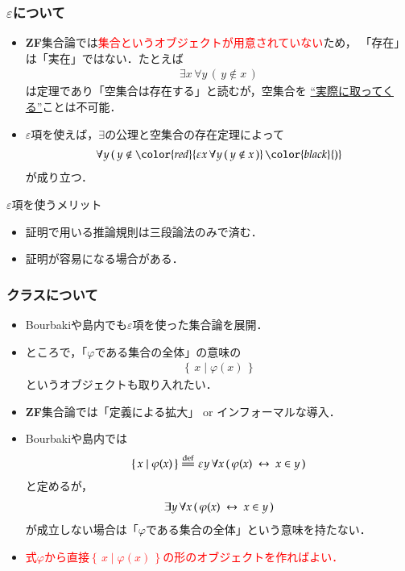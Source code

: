 \documentclass[dvipdfmx,10pt,notheorems]{beamer}
\theoremstyle{definition}
\newcommand{\Set}[2]{\left\{\, #1 \mid #2\, \right\}} %
\newcommand{\defeq}{\overset{\mathrm{def}}{=\joinrel=}} %
\newcommand{\lrarrow}{\hspace{0.25em}\leftrightarrow\hspace{0.25em}} %
\begin{document}
\begin{frame}\frametitle{$\varepsilon$について}
	\begin{itemize}
	\setlength{\itemsep}{10pt}
		\item {\bf ZF}集合論では\textcolor{red}{集合というオブジェクトが用意されていない}ため，
			「存在」は「実在」ではない．たとえば
			\begin{align}
				\exists x\, \forall y\, (\, y \notin x\, )
			\end{align}
			は定理であり「空集合は存在する」と読むが，空集合を
			\underline{``実際に取ってくる''}ことは不可能．
			
		\item $\varepsilon$項を使えば，$\exists$の公理と空集合の存在定理によって
			\begin{align}
				\forall y\, (\, y \notin \color{red}{\varepsilon x\, \forall y\, (\, y \notin x\, )}\, \color{black}{)}
			\end{align}
			が成り立つ．
	\end{itemize}
	
	\begin{block}{$\varepsilon$項を使うメリット}
		\begin{itemize}
			\item 証明で用いる推論規則は三段論法のみで済む．
			\item 証明が容易になる場合がある．
		\end{itemize}
	\end{block}
\end{frame}

\begin{frame}\frametitle{クラスについて}
	\begin{itemize}
		\item Bourbaki\cite{}や島内\cite{}でも$\varepsilon$項を使った集合論を展開．
		
		\item ところで，「$\varphi$である集合の全体」の意味の
			\begin{align}
				\Set{x}{\varphi(x)}
			\end{align}
			というオブジェクトも取り入れたい．
		
		\item {\bf ZF}集合論では「定義による拡大」 or インフォーマルな導入．
		
		\item Bourbaki\cite{}や島内\cite{}では
			\begin{align}
				\Set{x}{\varphi(x)} \defeq \varepsilon y\, \forall x\, 
				(\, \varphi(x) \lrarrow x \in y\, )
			\end{align}
			と定めるが，
			\begin{align}
				\exists y\, \forall x\, (\, \varphi(x) \lrarrow x \in y\, )
			\end{align}
			が成立しない場合は「$\varphi$である集合の全体」という意味を持たない．
			
		\item \textcolor{red}{式$\varphi$から直接$\Set{x}{\varphi(x)}$の形のオブジェクトを作ればよい．}
	\end{itemize}
\end{frame}
\end{document}
